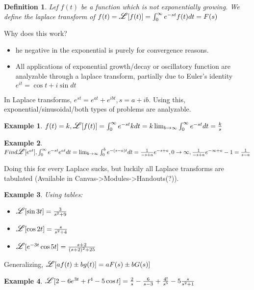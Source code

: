 \documentclass{article}
\newtheorem{definition}{Definition}
\newtheorem{example}{Example}
\newcommand\laplace{\mathlarger{\mathlarger{\mathscr{L}}}}
\begin{document}
\begin{definition}
	Lef $f(t)$ be a function which is not exponentially growing. We define the laplace transform of $f(t)=\laplace[f(t)]=\int_0^\infty{e^{-st}f(t)dt}=F(s)$
\end{definition}

Why does this work?

\begin{itemize}
	\item he negative in the exponential is purely for convergence reasons.
	\item All applications of exponential growth/decay or oscillatory function are analyzable through a laplace transform, partially due
		to Euler's identity $e^{it}=\cos{t}+i\sin{dt}$
\end{itemize}

In Laplace transforms, $e^{st}=e^{at}+e^{ibt}, s=a+ib$. Using this, exponential/sinusoidal/both types of problems are analyzable.

\begin{example}
	$f(t)=k, \laplace[f(t)]=\int_0^\infty{e^{-st} k dt}=k \lim_{b\rightarrow\infty}{\int_0^\infty{e^{-st}dt}}=\frac{k}{s}$
\end{example}

\begin{example}
	$Find \laplace[e^{at}], \int_0^\infty{e^{-st}e^{at}dt}=\lim_{b\rightarrow\infty}{\int_0^b{e^{-(s-a)t}dt}}
	\\=\frac{1}{-s+a}e^{-s+a}, 0\rightarrow \infty, \frac{1}{-s+a}e^{-\infty+a}-1=\frac{1}{s-a}$

\end{example}

Doing this for every Laplace sucks, but luckily all Laplace transforms are tabulated (Available in Canvas->Modules->Handouts(?)).


\begin{example}
	Using tables:

	\begin{itemize}
		\item $\laplace[\sin{3t}]=\frac{3}{s^2+9}$
		\item $\laplace[\cos{2t}]=\frac{s}{s^2+4}$
		\item $\laplace[e^{-3t}\cos{5t}]=\frac{s+2}{(s+2)^2+25}$
	\end{itemize}
\end{example}

Generalizing, $\laplace[a f(t) \pm b g(t)]=a F(s)\pm b G(s)]$

\begin{example}
	$\laplace[2-6e^{3t}+t^4-5\cos{t}]=\frac{2}{s}-\frac{6}{s-3}+\frac{4!}{s^{5}}-5\frac{s}{s^2+1}$
\end{example}
\end{document}
